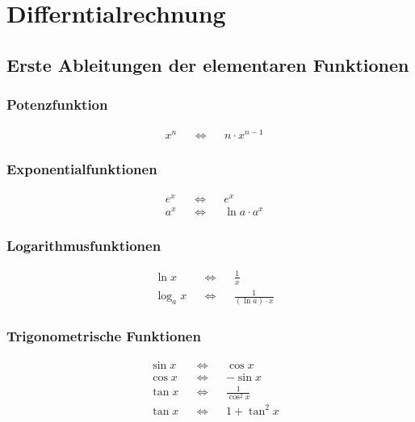 \section{Differntialrechnung}

\subsection{Erste Ableitungen der elementaren Funktionen}

\begin{multicols}{2}
\subsubsection*{Potenzfunktion}
 \begin{align*}
  &x^n& &\Longleftrightarrow& &n\cdot x^{n-1}
 \end{align*}
\vfill
\subsubsection*{Exponentialfunktionen}
 \begin{align*}
  &e^x& &\Longleftrightarrow& &e^x\\
  &a^x& &\Longleftrightarrow& &\ln a\cdot a^x
 \end{align*}
\vfill
\end{multicols}

\begin{multicols}{2}
\subsubsection*{Logarithmusfunktionen}
 \begin{align*} 
  &\ln x& &\Longleftrightarrow& &\frac{1}{x}\\
  &\log_a x& &\Longleftrightarrow& &\frac{1}{(\ln a)\cdot x}
 \end{align*}
\vfill
\subsubsection*{Trigonometrische Funktionen}
 \begin{align*} 
  &\sin x& &\Longleftrightarrow& &\cos x \\
  &\cos x& &\Longleftrightarrow& &-\sin x\\
  &\tan x& &\Longleftrightarrow& &\frac{1}{\cos^2 x}\\
  &\tan x& &\Longleftrightarrow& &1+\tan^2 x
\end{align*}
\vfill
\end{multicols}

